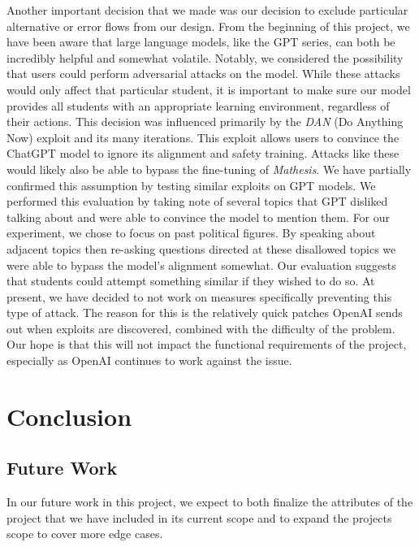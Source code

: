 \documentclass[12pt,a4paper]{article}
\begin{document}
    Another important decision that we made was our decision to exclude particular alternative or
    error flows from our design.  From the beginning of this project, we have been aware that
    large language models, like the GPT series, can both be incredibly helpful and somewhat volatile.
    Notably, we considered the possibility that users could perform adversarial attacks on the model.
    While these attacks would only affect that particular student, it is important to make sure
    our model provides all students with an appropriate learning environment, regardless of their actions.
    This decision was influenced primarily by the \textit{DAN}\cite{danThread} (Do Anything Now)
    exploit and its many iterations.  This exploit allows users to convince the ChatGPT model to
    ignore its alignment and safety training.  Attacks like these would likely also be able to
    bypass the fine-tuning of \textit{Mathesis}.  We have partially confirmed this assumption by
    testing similar exploits on GPT models.  We performed this evaluation by taking note of several
    topics that GPT disliked talking about and were able to convince the model to mention them.  For
    our experiment, we chose to focus on past political figures.  By speaking about adjacent topics
    then re-asking questions directed at these disallowed topics we were able to bypass the model's
    alignment somewhat.  Our evaluation suggests that students could attempt something
    similar if they wished to do so.  At present, we have decided to not work on measures
    specifically preventing this type of attack.  The reason for this is the relatively quick
    patches OpenAI sends out when exploits are discovered, combined with the difficulty of the
    problem.  Our hope is that this will not impact the functional requirements of the project,
    especially as OpenAI continues to work against the issue.

    \section{Conclusion}

    \subsection{Future Work}
    In our future work in this project, we expect to both finalize the attributes of the project that
    we have included in its current scope and to expand the projects scope to cover more edge cases.
\end{document}

